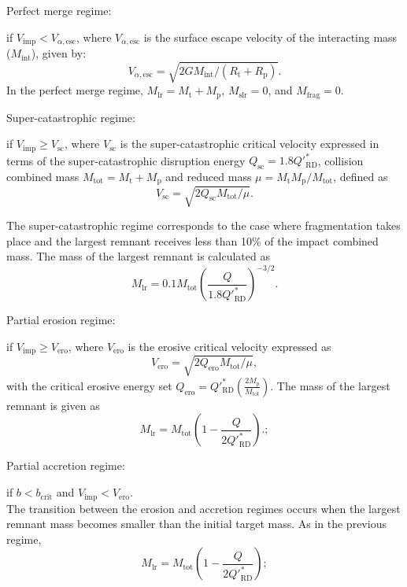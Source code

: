 \documentclass[fleqn,usenatbib]{mnras}
\begin{document}
\begin{enumerate}
  {\bf   \item Perfect merge regime:} if $V_{\text{imp}} < V_{\alpha,\text{esc}}$, where $V_{\alpha,\text{esc}}$ is the surface escape velocity of the interacting mass ($M_{\text{int}}$), given by: \label{r1}
\begin{equation}
V_{\alpha,\text{esc}} = \sqrt{2GM_{\text{int}}/(R_{\text{t}}+R_{\text{p}})}.
\end{equation}
In the perfect merge regime, $M_{\text{lr}}=M_{\text{t}}+M_{\text{p}}$, $M_{\text{slr}}=0$, and  $M_{\text{frag}}=0$. 

{\bf   \item Super-catastrophic regime:} if $V_{\text{imp}} \geq V_{\text{sc}}$, where $V_{\text{sc}}$ is the super-catastrophic critical velocity expressed in terms of the super-catastrophic disruption energy $Q_{\text{sc}} = 1.8Q'^*_{\text{RD}}$, collision combined mass $M_{\text{tot}}=M_{\text{t}}+M_{\text{p}}$ and reduced mass $\mu = M_{\text{t}}M_{\text{p}}/M_{\text{tot}}$, defined as \label{r2}
\begin{equation}
V_{\text{sc}} = \sqrt{2Q_{\text{sc}}M_{\text{tot}}/\mu}.
\end{equation}

The super-catastrophic regime corresponds to the case where fragmentation takes place and the largest remnant receives less than 10\% of the impact combined mass. The mass of the largest remnant is calculated as
\begin{equation}
M_{\text{lr}} = 0.1M_{\text{tot}}\left ( \frac{Q}{1.8Q'^*_{\text{RD}}} \right )^{-3/2}. 
\end{equation}


{\bf     \item Partial erosion regime:} if $V_{\text{imp}} \geq V_{\text{ero}}$, where $V_{\text{ero}}$ is the erosive critical velocity expressed as 
\begin{equation}
V_{\text{ero}} = \sqrt{2Q_{\text{ero}}M_{\text{tot}}/\mu},
\end{equation}
with the critical erosive energy set $Q_{\text{ero}} = Q'^*_{\text{RD}}\left (\frac{2M_p}{M_{\text{tot}}}\right )$. The mass of the largest remnant is given as
    \begin{equation}
    M_{\text{lr}} = M_{\text{tot}}\left (1- \frac{Q}{2Q'^*_{\text{RD}}} \right ).;
    \end{equation}

  {\bf   \item Partial accretion regime:} if $b < b_{\text{crit}}$ and $V_{\text{imp}} < V_{\text{ero}}$. \\
    The transition between the erosion and accretion regimes occurs when the largest remnant mass becomes smaller than the initial target mass. As in the previous regime,
        \begin{equation}
    M_{\text{lr}} = M_{\text{tot}}\left (1- \frac{Q}{2Q'^*_{\text{RD}}} \right );
    \end{equation}
    

\end{enumerate}
\end{document}
